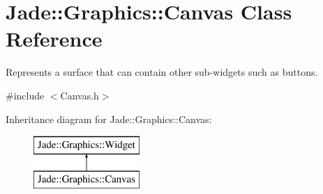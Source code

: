 \hypertarget{class_jade_1_1_graphics_1_1_canvas}{}\section{Jade\+:\+:Graphics\+:\+:Canvas Class Reference}
\label{class_jade_1_1_graphics_1_1_canvas}


Represents a surface that can contain other sub-\/widgets such as buttons.  




{\ttfamily \#include $<$Canvas.\+h$>$}

Inheritance diagram for Jade\+:\+:Graphics\+:\+:Canvas\+:\begin{figure}[H]
\begin{center}
\leavevmode
\includegraphics[height=2.000000cm]{class_jade_1_1_graphics_1_1_canvas}
\end{center}
\end{figure}
